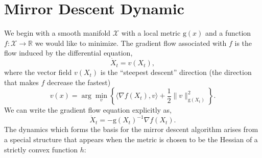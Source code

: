 \documentclass[11pt]{article}
\theoremstyle{plain}
\newcommand{\R}{{\mathbb R}}
\newcommand{\X}{{\mathcal X}}
\begin{document}
 \section{Mirror Descent Dynamic}
 \label{App:Mirror}
 We begin with a smooth manifold $\X$ with a local metric $\mathrm{g}(x)$ and a function $f:\X \rightarrow \R$ we would like to minimize. The gradient flow associated with $f$ is the flow induced by the differential equation,
\begin{equation}
\dot X_t = v(X_t),
\end{equation} where the vector field $v(X_t)$ is the ``steepest descent'' direction (the direction that makes $f$ decrease the fastest)
\begin{equation}
v(x) = \arg \min _v \left\{ \langle \nabla f(X_t), v\rangle + \frac{1}{2}\|v\|_{\mathrm{g}(X_t)}^2\right\}.
\end{equation}
We can write the gradient flow equation explicitly as,
\begin{equation}\label{Eq:ManGradFlow}
\dot X_t = - \mathrm{g}(X_t)^{-1} \nabla f(X_t).
\end{equation}
%
The dynamics which forms the basis for the mirror descent algorithm arises from a special structure that appears when the metric is chosen to be the Hessian of a strictly convex function $h$:
\end{document}
